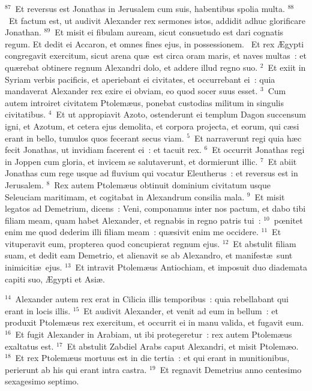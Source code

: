 ${}^{87}$~Et reversus est Jonathas in Jerusalem cum suis, habentibus spolia multa.
${}^{88}$~Et factum est, ut audivit Alexander rex sermones istos, addidit adhuc glorificare Jonathan.
${}^{89}$~Et misit ei fibulam auream, sicut consuetudo est dari cognatis regum. Et dedit ei Accaron, et omnes fines ejus, in possessionem.
~\lettrine[lines=10,image=true,loversize=0.05,lraise=-0.03]{E}{}t rex \AE gypti congregavit exercitum, sicut arena qu\ae\ est circa oram maris, et naves multas~: et qu\ae rebat obtinere regnum Alexandri dolo, et addere illud regno suo.
${}^{2}$~Et exiit in Syriam verbis pacificis, et aperiebant ei civitates, et occurrebant ei~: quia mandaverat Alexander rex exire ei obviam, eo quod socer suus esset.
${}^{3}$~Cum autem introiret civitatem Ptolem\ae us, ponebat custodias militum in singulis civitatibus.
${}^{4}$~Et ut appropiavit Azoto, ostenderunt ei templum Dagon succensum igni, et Azotum, et cetera ejus demolita, et corpora projecta, et eorum, qui c\ae si erant in bello, tumulos quos fecerant secus viam.
${}^{5}$~Et narraverunt regi quia h\ae c fecit Jonathas, ut invidiam facerent ei~: et tacuit rex.
${}^{6}$~Et occurrit Jonathas regi in Joppen cum gloria, et invicem se salutaverunt, et dormierunt illic.
${}^{7}$~Et abiit Jonathas cum rege usque ad fluvium qui vocatur Eleutherus~: et reversus est in Jerusalem.
${}^{8}$~Rex autem Ptolem\ae us obtinuit dominium civitatum usque Seleuciam maritimam, et cogitabat in Alexandrum consilia mala.
${}^{9}$~Et misit legatos ad Demetrium, dicens~: Veni, componamus inter nos pactum, et dabo tibi filiam meam, quam habet Alexander, et regnabis in regno patris tui~:
${}^{10}$~pœnitet enim me quod dederim illi filiam meam~: qu\ae sivit enim me occidere.
${}^{11}$~Et vituperavit eum, propterea quod concupierat regnum ejus.
${}^{12}$~Et abstulit filiam suam, et dedit eam Demetrio, et alienavit se ab Alexandro, et manifest\ae\ sunt inimiciti\ae\ ejus.
${}^{13}$~Et intravit Ptolem\ae us Antiochiam, et imposuit duo diademata capiti suo, \AE gypti et Asi\ae .


${}^{14}$~Alexander autem rex erat in Cilicia illis temporibus~: quia rebellabant qui erant in locis illis.
${}^{15}$~Et audivit Alexander, et venit ad eum in bellum~: et produxit Ptolem\ae us rex exercitum, et occurrit ei in manu valida, et fugavit eum.
${}^{16}$~Et fugit Alexander in Arabiam, ut ibi protegeretur~: rex autem Ptolem\ae us exaltatus est.
${}^{17}$~Et abstulit Zabdiel Arabs caput Alexandri, et misit Ptolem\ae o.
${}^{18}$~Et rex Ptolem\ae us mortuus est in die tertia~: et qui erant in munitionibus, perierunt ab his qui erant intra castra.
${}^{19}$~Et regnavit Demetrius anno centesimo sexagesimo septimo.


